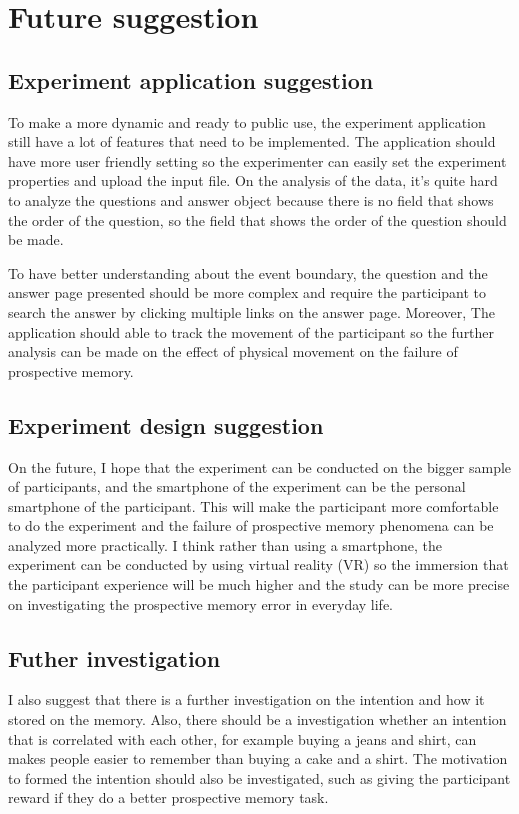 \section{Future suggestion}

\subsection{Experiment application suggestion}

To make a more dynamic and ready to public use, the experiment application still have a lot of features that need to be implemented.
The application should have more user friendly setting so the experimenter can easily set the experiment properties and upload the input file.
On the analysis of the data, it's quite hard to analyze the questions and answer object because there is no field that shows the order of the question, so
 the field that shows the order of the question should be made.

To have better understanding about the event boundary, the question and the answer page presented should be more complex and require
the participant to search the answer by clicking multiple links on the answer page.
Moreover, The application should able to track the movement of the participant so the further analysis can be made on the effect of physical movement
on the failure of prospective memory.


\subsection{Experiment design suggestion}
On the future, I hope that the experiment can be conducted on the bigger sample of participants, and the smartphone of the experiment can be the
personal smartphone of the participant. This will make the participant more comfortable to do the experiment and the failure of prospective memory
phenomena can be analyzed more practically.
I think rather than using a smartphone, the experiment can be conducted by using virtual reality (VR) so the immersion that the participant experience
will be much higher and the study can be more precise on investigating the prospective memory error in everyday life.

\subsection{Futher investigation}
I also suggest that there is a further investigation on the intention and how it stored on the memory. Also, there should be a investigation
whether an intention that is correlated with each other, for example buying a jeans and shirt, can makes people easier to remember than
buying a cake and a shirt. The motivation to formed the intention should also be investigated, such as giving the participant reward if they do
a better prospective memory task.


